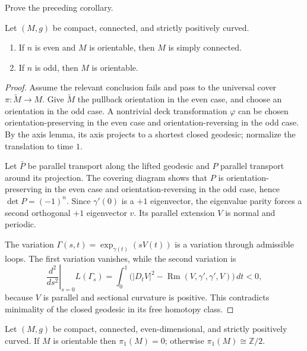 \begin{exercise}
\label{exer:prove-corollary-12-30}
Prove the preceding corollary.
\end{exercise}

\begin{theorem}[Synge]
\label{thm:synge-positive-sectional}
Let $(M,g)$ be compact, connected, and strictly positively curved.
\begin{enumerate}
\item[(a)] If $n$ is even and $M$ is orientable, then $M$ is simply connected.
\item[(b)] If $n$ is odd, then $M$ is orientable.
\end{enumerate}
\end{theorem}

\begin{proof}
\sketch
Assume the relevant conclusion fails and pass to the universal cover
$\pi:\widetilde M\to M$.  Give $\widetilde M$ the pullback orientation in
the even case, and choose an orientation in the odd case.  A nontrivial deck
transformation $\varphi$ can be chosen orientation-preserving in the even case
and orientation-reversing in the odd case.  By the axis lemma, its axis projects
to a shortest closed geodesic; normalize the translation to time $1$.

Let $\bar P$ be parallel transport along the lifted geodesic and $P$ parallel
transport around its projection.  The covering diagram shows that $P$ is
orientation-preserving in the even case and orientation-reversing in the odd
case, hence $\det P=(-1)^n$.  Since $\gamma'(0)$ is a $+1$ eigenvector, the
eigenvalue parity forces a second orthogonal $+1$ eigenvector $v$.  Its parallel
extension $V$ is normal and periodic.

The variation $\Gamma(s,t)=\exp_{\gamma(t)}(sV(t))$ is a variation through
admissible loops.  The first variation vanishes, while the second variation is
\[
\left.\frac{d^2}{ds^2}\right|_{s=0}L(\Gamma_s)
=\int_0^1\bigl(|D_tV|^2-\operatorname{Rm}(V,\gamma',\gamma',V)\bigr)\,dt<0,
\]
because $V$ is parallel and sectional curvature is positive.  This contradicts
minimality of the closed geodesic in its free homotopy class.
\end{proof}

\begin{corollary}
\label{cor:fundamental-groups-even-dimension}
Let $(M,g)$ be compact, connected, even-dimensional, and strictly positively
curved.  If $M$ is orientable then $\pi_1(M)=0$; otherwise
$\pi_1(M)\cong\mathbb Z/2$.
\end{corollary}

